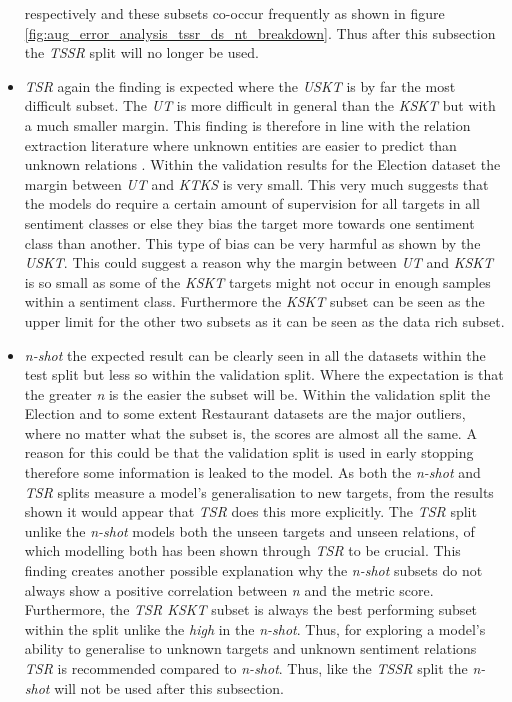 \begin{itemize}
respectively and these subsets co-occur frequently as shown in figure \ref{fig:aug_error_analysis_tssr_ds_nt_breakdown}. Thus after this subsection the \textit{TSSR} split will no longer be used. 
    \item \textit{TSR} again the finding is expected where the \textit{USKT} is by far the most difficult subset. The \textit{UT} is more difficult in general than the \textit{KSKT} but with a much smaller margin. This finding is therefore in line with the relation extraction literature where unknown entities are easier to predict than unknown relations \citep{levy-etal-2017-zero,abdou-etal-2019-x}. Within the validation results for the Election dataset the margin between \textit{UT} and \textit{KTKS} is very small. This very much suggests that the models do require a certain amount of supervision for all targets in all sentiment classes or else they bias the target more towards one sentiment class than another. This type of bias can be very harmful as shown by the \textit{USKT}. This could suggest a reason why the margin between \textit{UT} and \textit{KSKT} is so small as some of the \textit{KSKT} targets might not occur in enough samples within a sentiment class. Furthermore the \textit{KSKT} subset can be seen as the upper limit for the other two subsets as it can be seen as the data rich subset.
    \item \textit{n-shot} the expected result can be clearly seen in all the datasets within the test split but less so within the validation split. Where the expectation is that the greater \textit{n} is the easier the subset will be. Within the validation split the Election and to some extent Restaurant datasets are the major outliers, where no matter what the subset is, the scores are almost all the same. A reason for this could be that the validation split is used in early stopping therefore some information is leaked to the model. As both the \textit{n-shot} and \textit{TSR} splits measure a model's generalisation to new targets, from the results shown it would appear that \textit{TSR} does this more explicitly. The \textit{TSR} split unlike the \textit{n-shot} models both the unseen targets and unseen relations, of which modelling both has been shown through \textit{TSR} to be crucial. This finding creates another possible explanation why the \textit{n-shot} subsets do not always show a positive correlation between \textit{n} and the metric score. Furthermore, the \textit{TSR KSKT} subset is always the best performing subset within the split unlike the \textit{high} in the \textit{n-shot}. Thus, for exploring a model's ability to generalise to unknown targets and unknown sentiment relations \textit{TSR} is recommended compared to \textit{n-shot}. Thus, like the \textit{TSSR} split the \textit{n-shot} will not be used after this subsection.
\end{itemize}

